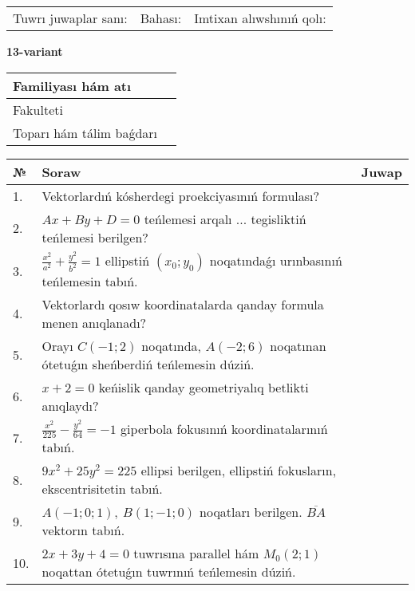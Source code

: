 \documentclass{article}
\begin{document}
\vspace{1cm}

\begin{tabular}{lll}
Tuwrı juwaplar sanı: \underline{\hspace{1.5cm}} & 
Bahası: \underline{\hspace{1.5cm}} & 
Imtixan alıwshınıń qolı: \underline{\hspace{2cm}} \\
\end{tabular}

\egroup

\newpage


\textbf{13-variant}\\

\bgroup
\def\arraystretch{1.6} %

\begin{tabular}{|m{5.7cm}|m{9.5cm}|}
\hline
Familiyası hám atı & \\
\hline
Fakulteti  & \\
\hline
Toparı hám tálim baǵdarı  & \\
\hline
\end{tabular}

\vspace{1cm}

\begin{tabular}{|m{0.7cm}|m{10cm}|m{4cm}|}
\hline
№ & Soraw & Juwap \\
\hline
1. & Vektorlardıń kósherdegi proekciyasınıń formulası? &  \\
\hline
2. & $Ax+By+D=0$ teńlemesi arqalı ... tegisliktiń teńlemesi berilgen? &  \\
\hline
3. & $\frac{x^2}{a^2}+\frac{y^2}{b^2}=1$ ellipstiń $(x_0;y_0)$ noqatındaǵı urınbasınıń teńlemesin tabıń. &  \\
\hline
4. & Vektorlardı qosıw koordinatalarda qanday formula menen anıqlanadı? &  \\
\hline
5. & Orayı $C (-1;2)$ noqatında, $A (-2;6 )$ noqatınan ótetuǵın sheńberdiń teńlemesin dúziń. &  \\
\hline
6. & $x+2=0$ keńislik qanday geometriyalıq betlikti anıqlaydı? &  \\
\hline
7. & $\frac{x^{2}}{225}-\frac{y^{2}}{64}=-1$ giperbola fokusınıń koordinatalarınıń tabıń. &  \\
\hline
8. & $9x^{2}+25y^{2}=225$ ellipsi berilgen, ellipstiń fokusların, ekscentrisitetin tabıń. &  \\
\hline
9. & $A (-1;0;1),\ B (1;-1;0)$ noqatları berilgen. $\overline{BA}$ vektorın tabıń. &  \\
\hline
10. & $2x+3y+4=0$ tuwrısına parallel hám $M_{0} (2;1)$ noqattan ótetuǵın tuwrınıń teńlemesin dúziń. &  \\
\hline
\end{tabular}
\end{document}
